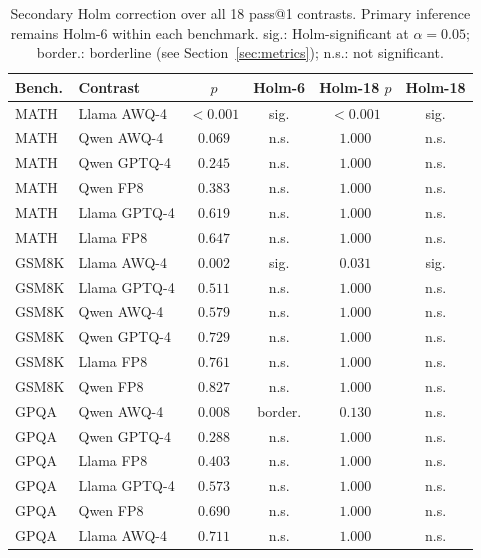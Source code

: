 \documentclass[11pt,a4paper]{article}
\begin{document}
\begin{table}[!htbp]
\centering
\caption{Secondary Holm correction over all 18 pass@1 contrasts. Primary inference remains Holm-6 within each benchmark. sig.: Holm-significant at $\alpha=0.05$; border.: borderline (see Section~\ref{sec:metrics}); n.s.: not significant.}
\label{tab:holm18}
\small
\begin{tabular}{llcccc}
\toprule
\textbf{Bench.} & \textbf{Contrast} & $p$ & \textbf{Holm-6} & \textbf{Holm-18 $p$} & \textbf{Holm-18} \\
\midrule
MATH & Llama AWQ-4 & $<0.001$ & sig. & $<0.001$ & sig. \\
MATH & Qwen AWQ-4 & $0.069$ & n.s. & $1.000$ & n.s. \\
MATH & Qwen GPTQ-4 & $0.245$ & n.s. & $1.000$ & n.s. \\
MATH & Qwen FP8 & $0.383$ & n.s. & $1.000$ & n.s. \\
MATH & Llama GPTQ-4 & $0.619$ & n.s. & $1.000$ & n.s. \\
MATH & Llama FP8 & $0.647$ & n.s. & $1.000$ & n.s. \\
GSM8K & Llama AWQ-4 & $0.002$ & sig. & $0.031$ & sig. \\
GSM8K & Llama GPTQ-4 & $0.511$ & n.s. & $1.000$ & n.s. \\
GSM8K & Qwen AWQ-4 & $0.579$ & n.s. & $1.000$ & n.s. \\
GSM8K & Qwen GPTQ-4 & $0.729$ & n.s. & $1.000$ & n.s. \\
GSM8K & Llama FP8 & $0.761$ & n.s. & $1.000$ & n.s. \\
GSM8K & Qwen FP8 & $0.827$ & n.s. & $1.000$ & n.s. \\
GPQA & Qwen AWQ-4 & $0.008$ & border. & $0.130$ & n.s. \\
GPQA & Qwen GPTQ-4 & $0.288$ & n.s. & $1.000$ & n.s. \\
GPQA & Llama FP8 & $0.403$ & n.s. & $1.000$ & n.s. \\
GPQA & Llama GPTQ-4 & $0.573$ & n.s. & $1.000$ & n.s. \\
GPQA & Qwen FP8 & $0.690$ & n.s. & $1.000$ & n.s. \\
GPQA & Llama AWQ-4 & $0.711$ & n.s. & $1.000$ & n.s. \\
\bottomrule
\end{tabular}
\end{table}

\FloatBarrier


\end{document}
